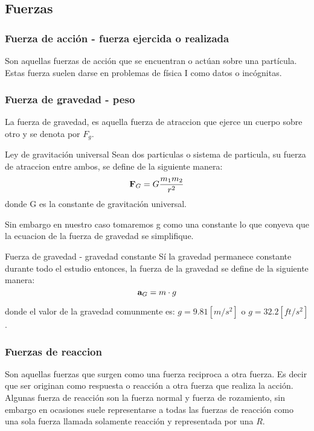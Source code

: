 \subsection*{Fuerzas}
\subsubsection*{Fuerza de acción - fuerza ejercida o realizada}
Son aquellas fuerzas de acción que se encuentran o actúan sobre una partícula. Estas fuerza suelen darse en problemas de física I como datos o incógnitas.
\subsubsection*{Fuerza de gravedad - peso}
La fuerza de gravedad, es aquella fuerza de atraccion que ejerce un cuerpo sobre otro y se denota por $F_g$.
\begin{Theorem*} {Ley de gravitación universal}
	Sean dos particulas o sistema de particula, su fuerza de atraccion entre ambos, se define de la siguiente manera:
	$$ \vb{F}_G=G\frac{m_1m_2}{r^2} $$
	donde G es la constante de gravitación universal.
\end{Theorem*}
Sin embargo en nuestro caso tomaremos g como una constante lo que conyeva que la ecuacion de la fuerza de gravedad se simplifique.
\begin{Theorem*} {Fuerza de gravedad - gravedad constante}
	Sí la gravedad permanece constante durante todo el estudio entonces, la fuerza de la gravedad se define de la siguiente manera:
	$$ \vb{a}_G=m\cdot g $$
\end{Theorem*}
donde el valor de la gravedad comunmente es: $g=9.81[m/s^2]$ o $g=32.2[ft/s^2]$.
\subsubsection*{Fuerzas de reaccion}
Son aquellas fuerzas que surgen como una fuerza reciproca a otra fuerza. Es decir que ser originan como respuesta o reacción a otra fuerza que realiza la acción. \\
Algunas fuerza de reacción son la fuerza normal y fuerza de rozamiento, sin embargo en ocasiones suele representarse a todas las fuerzas de reacción como una sola fuerza llamada solamente reacción y representada por una $R$.
